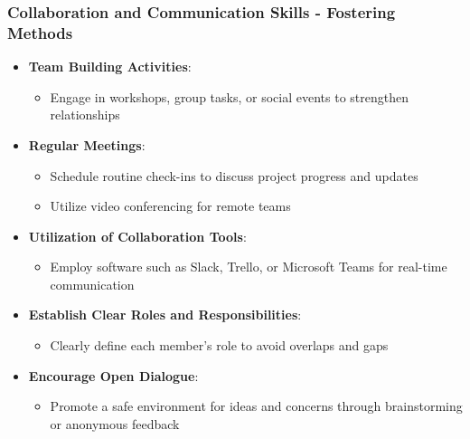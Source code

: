 \documentclass{beamer}
\begin{document}
\begin{frame}[fragile]
    \frametitle{Collaboration and Communication Skills - Fostering Methods}
    \begin{itemize}
        \item \textbf{Team Building Activities}:
        \begin{itemize}
            \item Engage in workshops, group tasks, or social events to strengthen relationships
        \end{itemize}

        \item \textbf{Regular Meetings}:
        \begin{itemize}
            \item Schedule routine check-ins to discuss project progress and updates
            \item Utilize video conferencing for remote teams
        \end{itemize}

        \item \textbf{Utilization of Collaboration Tools}:
        \begin{itemize}
            \item Employ software such as Slack, Trello, or Microsoft Teams for real-time communication
        \end{itemize}

        \item \textbf{Establish Clear Roles and Responsibilities}:
        \begin{itemize}
            \item Clearly define each member’s role to avoid overlaps and gaps
        \end{itemize}

        \item \textbf{Encourage Open Dialogue}:
        \begin{itemize}
            \item Promote a safe environment for ideas and concerns through brainstorming or anonymous feedback
        \end{itemize}
    \end{itemize}
\end{frame}
\end{document}
